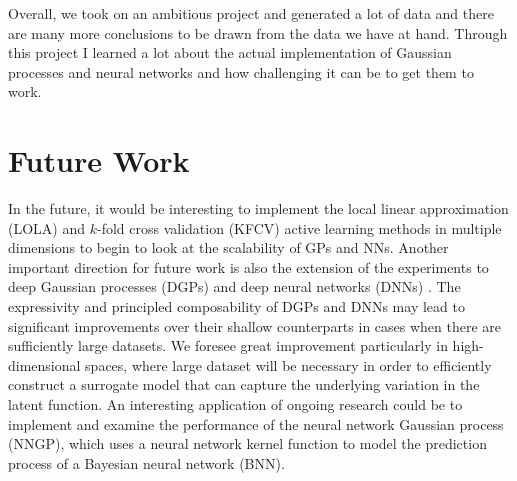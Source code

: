 \documentclass[conference]{IEEEtran}
\begin{document}
	Overall, we took on an ambitious project and generated a lot of data and there are many more conclusions to be drawn from the data we have at hand. Through this project I learned a lot about the actual implementation of Gaussian processes and neural networks and how challenging it can be to get them to work.
	
	\section{Future Work}
	\label{sec:future-work}
	
	In the future, it would be interesting to implement the local linear approximation (LOLA) and $k$-fold cross validation (KFCV) active learning methods in multiple dimensions to begin to look at the scalability of GPs and NNs. Another important direction for future work is also the extension of the experiments to deep Gaussian processes (DGPs) and deep neural networks (DNNs) \cite{Damianou2013DeepProcesses}. The expressivity and principled composability of DGPs and DNNs may lead to significant improvements over their shallow counterparts in cases when there are sufficiently large datasets. We foresee great improvement particularly in high-dimensional spaces, where large dataset will be necessary in order to efficiently construct a surrogate model that can capture the underlying variation in the latent function. An interesting application of ongoing research could be to implement and examine the performance of the neural network Gaussian process (NNGP), which uses a neural network kernel function to model the prediction process of a Bayesian neural network (BNN).
	
	
	
	
	
\end{document}
